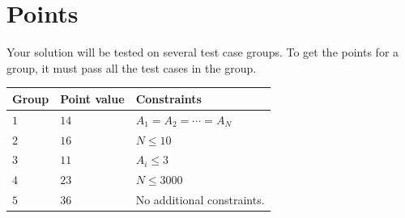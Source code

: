 \section*{Points}
Your solution will be tested on several test case groups.
To get the points for a group, it must pass all the test cases in the group.

\noindent
\begin{tabular}{| l | l | l |}
  \hline
  \textbf{Group} & \textbf{Point value} & \textbf{Constraints} \\ \hline
  $1$   & $14$       & $A_1 = A_2 = \cdots = A_N$\\ \hline
  $2$   & $16$       & $N \leq 10$  \\ \hline
  $3$   & $11$       & $A_i \leq 3$ \\ \hline
  $4$   & $23$       & $N \leq 3000$ \\ \hline
  $5$   & $36$       & No additional constraints. \\ \hline
\end{tabular}


